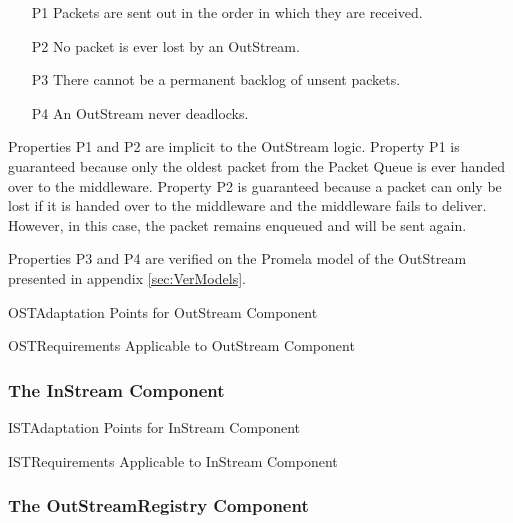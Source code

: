 \documentclass{pnp_article}
\begin{document}
\begin{itemize}
\item[P1]{Packets are sent out in the order in which they are received.}
\item[P2]{No packet is ever lost by an OutStream.}
\item[P3]{There cannot be a permanent backlog of unsent packets.}
\item[P4]{An OutStream never deadlocks.}
\end{itemize}

Properties P1 and P2 are implicit to the OutStream logic. Property P1 is guaranteed because only the oldest packet from the Packet Queue is ever handed over to the middleware. Property P2 is guaranteed because a packet can only be lost if it is handed over to the middleware and the middleware fails to deliver. However, in this case, the packet remains enqueued and will be sent again.

Properties P3 and P4 are verified on the Promela model of the OutStream presented in appendix \ref{sec:VerModels}. 

\begin{crAp}{OST}{Adaptation Points for OutStream Component}
\end{crAp}

\begin{crReq}{OST}{Requirements Applicable to OutStream Component}
\end{crReq}

\subsubsection{The InStream Component}\label{sec:InStream}


\begin{crAp}{IST}{Adaptation Points for InStream Component}
\end{crAp}

\pagebreak[4]
\begin{crReq}{IST}{Requirements Applicable to InStream Component}
\end{crReq}

\subsubsection{The OutStreamRegistry Component}\label{sec:OutStreamRegistry}

\end{document}
